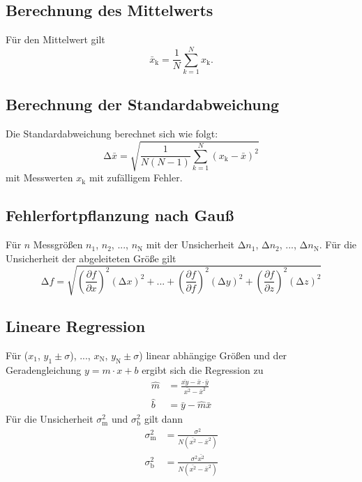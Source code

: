 \subsection{Berechnung des Mittelwerts}
  \label{sec:mittelwert}
  Für den Mittelwert gilt
  \begin{equation}
    \bar{x}_\text{k} = \frac{1}{N} \sum_{k = 1}^{N} x_\text{k}.
  \end{equation}
\subsection{Berechnung der Standardabweichung}
  \label{sec:standardabweichung}
  Die Standardabweichung berechnet sich wie folgt:
  \begin{equation}
    \increment \bar{x} = \sqrt{\frac{1}{N(N-1)} \sum_{k = 1}^{N}(x_\text{k} - \bar{x})^2 }
  \end{equation}
  mit Messwerten $x_\text{k}$ mit zufälligem Fehler.
\subsection{Fehlerfortpflanzung nach Gauß}
  \label{sec:fehlerfortpflanzung}
  Für $n$ Messgrößen $n_\text{1}$, $n_\text{2}$, ..., $n_\text{N}$ mit der Unsicherheit
  $\increment n_\text{1}$, $\increment n_\text{2}$, ..., $\increment n_\text{N}$. Für die Unsicherheit
  der abgeleiteten Größe gilt
  \begin{equation}
    \increment f = \sqrt{\left(\frac{\partial f}{\partial x} \right)^2 (\increment x)^2 + ... + \left(\frac{\partial f}{\partial f} \right)^2 (\increment y)^2 + \left(\frac{\partial
    f}{\partial z} \right)^2 (\increment z)^2}
  \end{equation}
\subsection{Lineare Regression}
  \label{sec:regression}
  Für ($x_\text{1}$, $y_\text{1} \pm \sigma$), ..., $x_\text{N}$, $y_\text{N} \pm \sigma$) linear abhängige Größen und der Geradengleichung $y = m \cdot x + b$ ergibt sich die
  Regression zu
  \begin{align}
    \hat{m}  & = \frac{\bar{xy} - \bar{x} \cdot \bar{y}}{\bar{x^2} - \bar{x}^2} \\
    \hat{b}  & = \bar{y} - \hat{m} \bar{x}
  \end{align}
  Für die Unsicherheit $\sigma_\text{m}^2$ und $\sigma_\text{b}^2$ gilt dann
  \begin{align}
    \sigma_\text{m}^2 & = \frac{\sigma^2}{N(\bar{x^2} - \bar{x}^2)} \\
    \sigma_\text{b}^2 & = \frac{\sigma^2 \bar{x^2}}{N(\bar{x^2} - \bar{x}^2)}
  \end{align}
